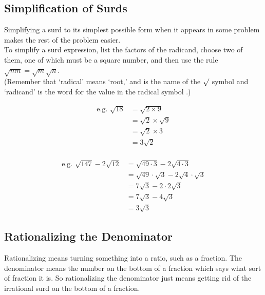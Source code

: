 \documentclass{article}
\begin{document}
\newpage

\subsection*{Simplification of Surds}

\doublespacing
Simplifying a surd to its simplest possible form when it appears in some problem makes the rest of the problem easier.\\

To simplify a surd expression, list the factors of the radicand, choose two of them, one of which must be a square number, and then use the rule $\sqrt{mn}=\sqrt{m}\sqrt{n}$.\\

(Remember that ‘radical’ means ‘root,’ and is the name of the $\surd$ symbol and ‘radicand’ is the word for the value in the radical symbol .)\\

\newpage

\doublespacing
\begin{align*}
\text{e.g. }
\sqrt{18}
&=\sqrt{2 \times 9}\\
&=\sqrt{2} \times \sqrt{9}\\
&=\sqrt{2} \times 3\\
&=3\sqrt{2}\\
\end{align*}

\begin{align*}
\text{e.g. }
\sqrt{147}-2\sqrt{12}
&=\sqrt{49 \cdot 3}-2\sqrt{4 \cdot 3}\\
&=\sqrt{49} \cdot \sqrt{3}-2\sqrt{4} \cdot \sqrt{3}\\
&=7\sqrt{3}-2 \cdot 2\sqrt{3}\\
&=7\sqrt{3}-4\sqrt{3}\\
&=3\sqrt{3}
\end{align*}
\singlespacing

\newpage

\subsection*{Rationalizing the Denominator}
Rationalizing means turning something into a ratio, such as a fraction. The denominator means the number on the bottom of a fraction which says what sort of fraction it is. So rationalizing the denominator just means getting rid of the irrational surd on the bottom of a fraction.\\
\end{document}
